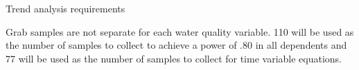\begin{frame}{Trend analysis requirements}
			\begin{block}{}
				Grab samples are not separate for each water quality variable.  110 will be used as the number of samples to collect to achieve a power of .80 in all dependents and 77 will be used as the number of samples to collect for time variable equations.
			\end{block}
			
		\end{frame}